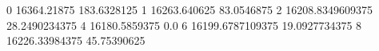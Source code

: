 0 16364.21875 183.6328125
1 16263.640625 83.0546875
2 16208.8349609375 28.2490234375
4 16180.5859375 0.0
6 16199.6787109375 19.0927734375
8 16226.33984375 45.75390625
